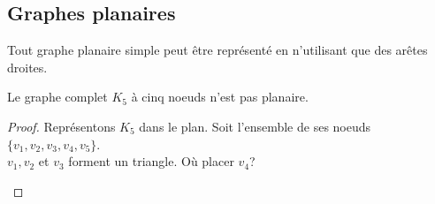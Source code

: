 \subsection{Graphes planaires}
\begin{mytheo} [Fáry]
Tout graphe planaire simple peut être représenté en n'utilisant que des arêtes droites.
\end{mytheo}



\begin{mytheo}
Le graphe complet $K_5$ à cinq noeuds n'est pas planaire.

\begin{proof}

Représentons $K_5$ dans le plan. Soit l'ensemble de ses noeuds $\{v_1, v_2, v_3, v_4, v_5\}$.\\
$v_1, v_2$ et $v_3$ forment un triangle. Où placer $v_4$?

\begin{center}
\end{center}



\end{proof}
\end{mytheo}

